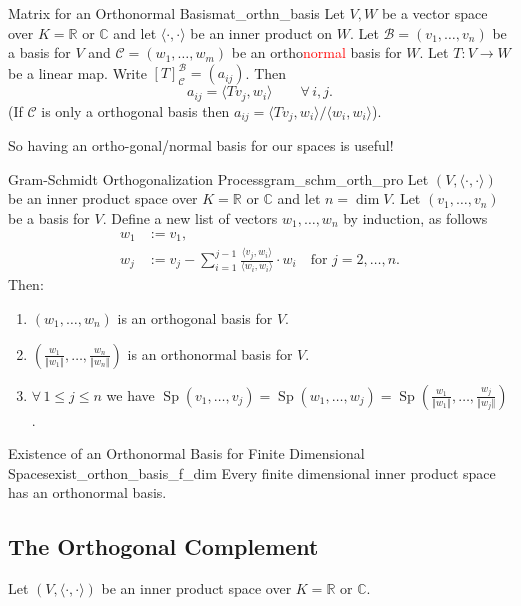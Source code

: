 \begin{corollary}{Matrix for an Orthonormal Basis}{mat_orthn_basis}
	Let $V, W$ be a vector space over $K = \mathbb{R}$ or $\mathbb{C}$ and let $\langle \cdot , \cdot \rangle $ be an inner product on $W$. Let $\mathcal{B} = (v_1, \hdots , v_n)$ be a basis for $V$ and $\mathcal{C} = (w_1, \hdots , w_m)$ be an ortho\textcolor{red}{normal} basis for $W$. Let $T: V \to W$ be a linear map. Write $[T]^{\mathcal{B}}_{\mathcal{C}} = (a_{ij})$. Then
	\[
		a_{ij} = \langle Tv_j, w_i \rangle \qquad  \forall \, i,j.
	\] 
	(If $\mathcal{C}$ is only a orthogonal basis then $a_{ij} = \langle Tv_j, w_i \rangle / \langle w_i, w_i \rangle$).
\end{corollary}

So having an ortho-gonal/normal basis for our spaces is useful!

\begin{theorem}{Gram-Schmidt Orthogonalization Process}{gram_schm_orth_pro}
	Let $(V, \langle \cdot , \cdot \rangle)$ be an inner product space over $K = \mathbb{R}$ or $\mathbb{C}$ and let $n = \dim V$. Let $(v_1, \hdots ,v_n)$ be a basis for $V$. Define a new list of vectors $w_1, \hdots , w_n$ by induction, as follows
	\begin{align*}
		w_1 &:= v_1,\\
		w_j &:= v_j - \sum_{i=1}^{j-1} \frac{\langle v_j, w_i \rangle}{\langle w_i, w_i \rangle} \cdot w_i \quad \text{for } j = 2, \hdots , n.
	\end{align*} 
	Then:
	\begin{enumerate}
		\item $(w_1, \hdots , w_n)$ is an orthogonal basis for $V$.
		\item $(\frac{w_1}{\Vert w_1 \Vert} , \hdots , \frac{w_n}{\Vert w_n \Vert})$ is an orthonormal basis for $V$.
		\item $\forall \, 1 \leq j \leq n$ we have $\operatorname{Sp}(v_1, \hdots , v_j) = \operatorname{Sp}(w_1, \hdots , w_j) = \operatorname{Sp}(\frac{w_1}{\Vert w_1 \Vert} , \hdots , \frac{w_j}{\Vert w_j \Vert})$.
	\end{enumerate}
\end{theorem}

\begin{corollary}{Existence of an Orthonormal Basis for Finite Dimensional Spaces}{exist_orthon_basis_f_dim}
	Every finite dimensional inner product space has an orthonormal basis.
\end{corollary}


\subsection{The Orthogonal Complement}
Let $(V, \langle \cdot , \cdot \rangle)$ be an inner product space over $K = \mathbb{R}$ or $\mathbb{C}$.

